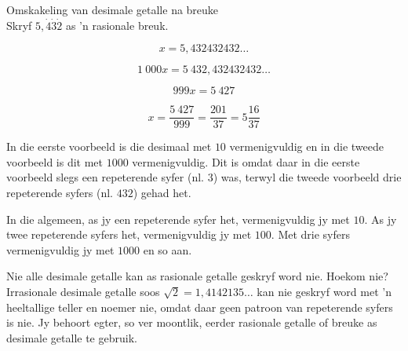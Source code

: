 \clearpage
\begin{wex}
{%
Omskakeling van desimale getalle na breuke
}
{%
\\Skryf $5,\dot{4}\dot{3}\dot{2}$ as 'n rasionale breuk.
}
{%


$$ x = 5,432432432\ldots $$


$$ 1~000x = 5~432,432432432\ldots $$


$$ 999x = 5~427 $$


$$ x = \dfrac{5~427}{999} = \dfrac{201}{37}=5\dfrac{16}{37} $$

}
\end{wex}

In die eerste voorbeeld is die desimaal met $10$  vermenigvuldig en in die tweede voorbeeld is dit met $1000$ vermenigvuldig. Dit is omdat daar in die eerste voorbeeld slegs een repeterende syfer (nl. $3$) was, terwyl die tweede voorbeeld drie repeterende syfers (nl. $432$) gehad het.\par 
In die algemeen, as jy een repeterende syfer het, vermenigvuldig jy met $10$.  As jy twee repeterende syfers het, vermenigvuldig jy met $100$.  Met drie syfers vermenigvuldig jy met $1000$ en so aan.\clearpage

Nie alle desimale getalle kan as rasionale getalle geskryf word nie. Hoekom nie? Irrasionale desimale getalle soos
$\sqrt{2}=1,4142135\ldots$
kan nie geskryf word met ’n heeltallige teller en noemer nie, omdat daar geen patroon van repeterende syfers is nie. Jy behoort egter, so ver moontlik, eerder rasionale getalle of breuke as desimale getalle te gebruik.






